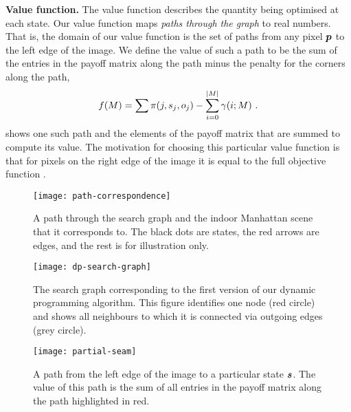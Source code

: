 \textbf{Value function.} The value function describes the quantity
being optimised at each state. Our value function maps \textit{paths
  through the graph} to real numbers. That is, the domain of our value
function is the set of paths from any pixel $\Pixel$ to the left edge
of the image. We define the value of such a path to be the sum of the
entries in the payoff matrix along the path minus the penalty for the
corners along the path, \ie
\begin{equation}
  \Objective(\PartialScene) = \sum
    \PixelPayoff(j,\seam_j,\WallOrient_j) -
    \sum_{i=0}^{\SceneLen} \CornerPenalty(i;\PartialScene) ~.
  \label{eq:scene-value}
\end{equation}
 shows one such path and the elements of the
payoff matrix that are summed to compute its value. The motivation for
choosing this particular value function is that for pixels on the
right edge of the image it is equal to the full objective function
.

\begin{figure}[tb]
  \centering
  \texttt{[image: path-correspondence]}
  \caption{A path through the search graph and the indoor Manhattan
    scene that it corresponds to. The black dots are states, the red
    arrows are edges, and the rest is for illustration only.}
  \label{fig:path-correspondence}
\end{figure}

\begin{figure}[tb]
  \centering
  \texttt{[image: dp-search-graph]}
  \caption{The search graph corresponding to the first version of our
    dynamic programming algorithm. This figure identifies one node
    (red circle) and shows all neighbours to which it is connected via
    outgoing edges (grey circle).}
  \label{fig:dp-search-graph}
\end{figure}

\begin{figure}[tb]
  \centering
  \texttt{[image: partial-seam]}
  \caption{A path from the left edge of the image to a particular
    state $\State$. The value of this path is the sum of all entries
    in the payoff matrix along the path highlighted in red.}
  \label{fig:partial-seam}
\end{figure}

